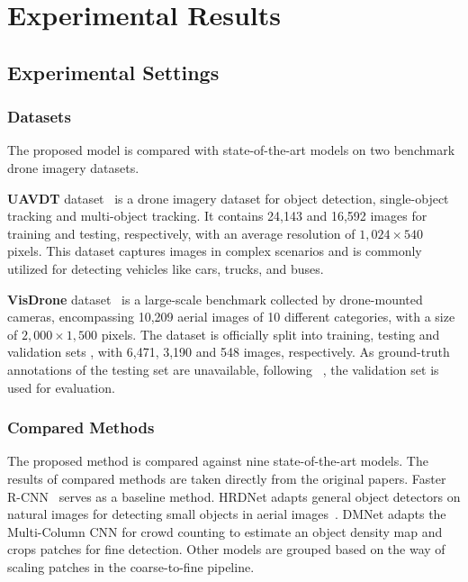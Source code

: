 \documentclass[letterpaper]{article} %
\def \ie {\emph{i.e.}}
\newcommand\qz[1]{\textcolor{blue}{\{QZ: #1\}}}
\begin{document}
\section{Experimental Results}
\label{sec: experiments}

\subsection{Experimental Settings}
\label{ssec: experimental settings}

\subsubsection{Datasets}
\label{sssec:dataset}
The proposed model is compared with state-of-the-art models on two benchmark drone imagery datasets. %

\noindent \textbf{UAVDT} dataset~\cite{Du_2018_UAVDT} is a drone imagery dataset %
for object detection, single-object tracking and multi-object tracking. It contains 24,143 and 16,592 images for training and testing, respectively, with an average resolution of $1,024\times540$ pixels. %
This dataset captures images in complex scenarios and is commonly utilized for detecting vehicles like cars, trucks, and buses.

\noindent \textbf{VisDrone} dataset~\cite{Zhu_2022_VisDrone} is a large-scale benchmark collected by drone-mounted cameras, %
encompassing 10,209 aerial images of 10 different categories, with a size of $2,000\times1,500$ pixels. The dataset is officially split into training, testing and validation sets%
, with 6,471, 3,190 and 548 images, %
respectively. As ground-truth annotations of the testing set are unavailable, following %
~\cite{Liu_2021_HRDNet, Ge_2022_ZoomAndReasoning}, the validation set is used for evaluation.

\subsubsection{Compared Methods}
The proposed method is compared against nine state-of-the-art models. The results of compared methods are taken directly from the original papers.
Faster R-CNN~\cite{Ren_2017_Faster} serves as a baseline method.
HRDNet adapts general object detectors on natural images for detecting small objects in aerial images~\cite{Liu_2021_HRDNet}. DMNet \cite{Li_2020_Density_Workshops} adapts the Multi-Column CNN for crowd counting to estimate an object density map and crops patches for fine detection. Other models are grouped based on the way of scaling patches in the coarse-to-fine pipeline.
\end{document}
